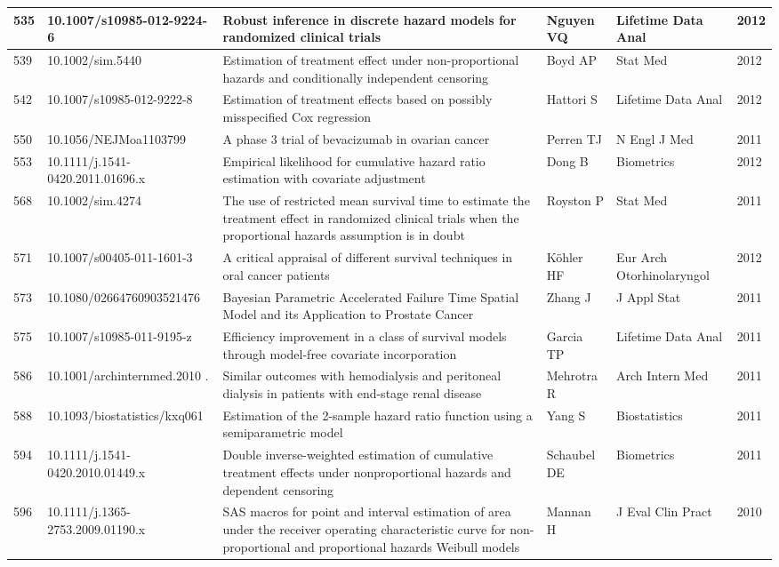 \begin{landscape}
\begin{longtable}{|p{0.3in}|p{1.8in}|p{2.4in}|p{0.68in}|p{0.89in}|p{0.3in}|}
535 & 10.1007/s10985-012-9224-6   & Robust inference in discrete hazard models for randomized clinical trials & Nguyen VQ & Lifetime Data Anal & 2012 \\ \hline 
539 & 10.1002/sim.5440   & Estimation of treatment effect under non-proportional hazards and conditionally independent censoring & Boyd AP & Stat Med & 2012 \\ \hline 
542 & 10.1007/s10985-012-9222-8   & Estimation of treatment effects based on possibly misspecified Cox regression & Hattori S & Lifetime Data Anal & 2012 \\ \hline 
550 & 10.1056/NEJMoa1103799   & A phase 3 trial of bevacizumab in ovarian cancer & Perren TJ & N Engl J Med & 2011 \\ \hline 
553 & 10.1111/j.1541-0420.2011.01696.x   & Empirical likelihood for cumulative hazard ratio estimation with covariate adjustment & Dong B & Biometrics & 2012 \\ \hline 
568 & 10.1002/sim.4274   & The use of restricted mean survival time to estimate the treatment effect in randomized clinical trials when the proportional hazards assumption is in doubt & Royston P & Stat Med & 2011 \\ \hline 
571 & 10.1007/s00405-011-1601-3   & A critical appraisal of different survival techniques in oral cancer patients & K\"{o}hler HF & Eur Arch Otorhinolaryngol & 2012 \\ \hline 
573 & 10.1080/02664760903521476    & Bayesian Parametric Accelerated Failure Time Spatial Model and its Application to Prostate Cancer & Zhang J & J Appl Stat & 2011 \\ \hline 
575 & 10.1007/s10985-011-9195-z    & Efficiency improvement in a class of survival models through model-free covariate incorporation & Garcia TP & Lifetime Data Anal & 2011 \\ \hline 
586 & 10.1001/archinternmed.2010  .\-352  & Similar outcomes with hemodialysis and peritoneal dialysis in patients with end-stage renal disease & Mehrotra R & Arch Intern Med & 2011 \\ \hline 
588 & 10.1093/biostatistics/kxq061    & Estimation of the 2-sample hazard ratio function using a semiparametric model & Yang S & Biostatistics & 2011 \\ \hline 
594 & 10.1111/j.1541-0420.2010.01449.x      & Double inverse-weighted estimation of cumulative treatment effects under nonproportional hazards and dependent censoring & Schaubel DE & Biometrics & 2011 \\ \hline 
596 & 10.1111/j.1365-2753.2009.01190.x     & SAS macros for point and interval estimation of area under the receiver operating characteristic curve for non-proportional and proportional hazards Weibull models & Mannan H & J Eval Clin Pract & 2010 \\ \hline 

\end{longtable}
\end{landscape}
